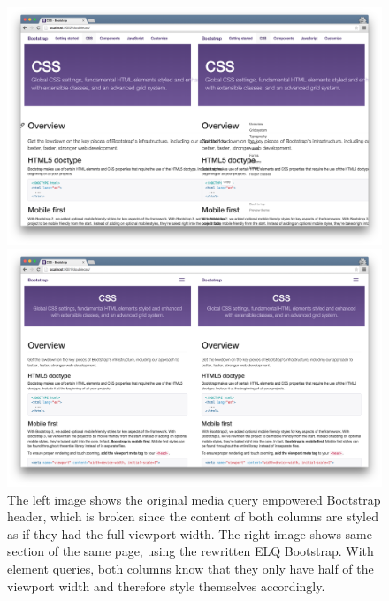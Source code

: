 \documentclass[a4paper,11pt]{kth-mag}
\begin{document}
      \begin{figure}[htbp]
        \centering
        \begin{minipage}{.5\textwidth}
          \centering
          \includegraphics[width=\linewidth]{images/bootstrap-mq-header-small}
        \end{minipage}%
        \begin{minipage}{.5\textwidth}
          \centering
          \includegraphics[width=\linewidth]{images/bootstrap-eq-header-small}
        \end{minipage}
        \caption{
          The left image shows the original media query empowered Bootstrap header, which is broken since the content of both columns are styled as if they had the full viewport width.
          The right image shows same section of the same page, using the rewritten \gls{ELQ} Bootstrap.
          With element queries, both columns know that they only have half of the viewport width and therefore style themselves accordingly.}
        \label{fig:eval-bootstrap-mq-eq-header}
      \end{figure}
\end{document}
